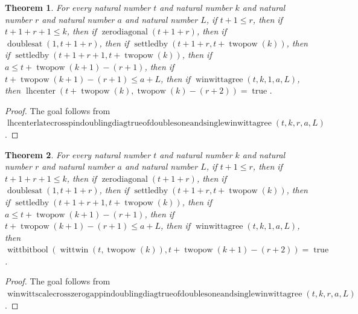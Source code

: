\documentclass[11pt]{article}
\newtheorem{theorem}{Theorem}[section]
\theoremstyle{definition}
\begin{document}
\begin{theorem}
\label{ll:paper:lhcenter-late-cross-pin-doubling-diag-true-of-doubles-one-and-single-winwittagree}
For every natural number \(t\) and natural number \(k\) and natural number \(r\) and natural number \(a\) and natural number \(L\), if \(t + 1 \le r\), then if \(t + 1 + r + 1 \le k\), then if \(\operatorname{zerodiagonal}(t + 1 + r)\), then if \(\operatorname{doublesat}(1, t + 1 + r)\), then if \(\operatorname{settledby}(t + 1 + r, t + \operatorname{twopow}(k))\), then if \(\operatorname{settledby}(t + 1 + r + 1, t + \operatorname{twopow}(k))\), then if \(a \le t + \operatorname{twopow}(k + 1) - (r + 1)\), then if \(t + \operatorname{twopow}(k + 1) - (r + 1) \le a + L\), then if \(\operatorname{winwittagree}(t, k, 1, a, L)\), then \(\operatorname{lhcenter}(t + \operatorname{twopow}(k), \operatorname{twopow}(k) - (r + 2)) = \operatorname{true}\).
\end{theorem}
\begin{proof}
The goal follows from \(\operatorname{lhcenterlatecrosspindoublingdiagtrueofdoublesoneandsinglewinwittagree}(t, k, r, a, L)\).
\end{proof}
\begin{theorem}
\label{ll:paper:winwitt-scale-cross-zero-gap-pin-doubling-diag-true-of-doubles-one-and-single-winwittagree}
For every natural number \(t\) and natural number \(k\) and natural number \(r\) and natural number \(a\) and natural number \(L\), if \(t + 1 \le r\), then if \(t + 1 + r + 1 \le k\), then if \(\operatorname{zerodiagonal}(t + 1 + r)\), then if \(\operatorname{doublesat}(1, t + 1 + r)\), then if \(\operatorname{settledby}(t + 1 + r, t + \operatorname{twopow}(k))\), then if \(\operatorname{settledby}(t + 1 + r + 1, t + \operatorname{twopow}(k))\), then if \(a \le t + \operatorname{twopow}(k + 1) - (r + 1)\), then if \(t + \operatorname{twopow}(k + 1) - (r + 1) \le a + L\), then if \(\operatorname{winwittagree}(t, k, 1, a, L)\), then \(\operatorname{wittbitbool}(\operatorname{wittwin}(t, \operatorname{twopow}(k)), t + \operatorname{twopow}(k + 1) - (r + 2)) = \operatorname{true}\).
\end{theorem}
\begin{proof}
The goal follows from \(\operatorname{winwittscalecrosszerogappindoublingdiagtrueofdoublesoneandsinglewinwittagree}(t, k, r, a, L)\).
\end{proof}
\end{document}
